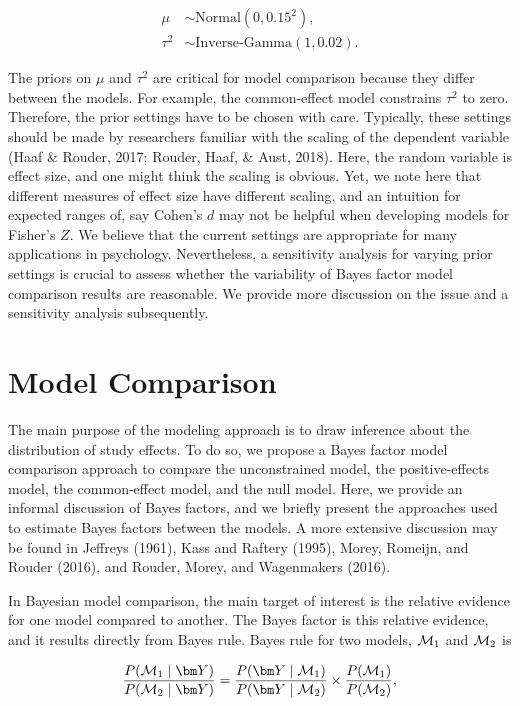 \documentclass[english,,man]{apa6}
\begin{document}
\begin{align*}
\mu &\sim \mbox{Normal}(0, 0.15^2),\\
\tau^2 &\sim \mbox{Inverse-Gamma}(1, 0.02).
\end{align*}

The priors on \(\mu\) and \(\tau^2\) are critical for model comparison because they differ between the models. For example, the common-effect model constrains \(\tau^2\) to zero. Therefore, the prior settings have to be chosen with care. Typically, these settings should be made by researchers familiar with the scaling of the dependent variable (Haaf \& Rouder, 2017; Rouder, Haaf, \& Aust, 2018). Here, the random variable is effect size, and one might think the scaling is obvious. Yet, we note here that different measures of effect size have different scaling, and an intuition for expected ranges of, say Cohen's \(d\) may not be helpful when developing models for Fisher's \(Z\). We believe that the current settings are appropriate for many applications in psychology. Nevertheless, a sensitivity analysis for varying prior settings is crucial to assess whether the variability of Bayes factor model comparison results are reasonable. We provide more discussion on the issue and a sensitivity analysis subsequently.

\hypertarget{model-comparison}{%
\section{Model Comparison}\label{model-comparison}}

The main purpose of the modeling approach is to draw inference about the distribution of study effects.
To do so, we propose a Bayes factor model comparison approach to compare the unconstrained model, the positive-effects model, the common-effect model, and the null model. Here, we provide an informal discussion of Bayes factors, and we briefly present the approaches used to estimate Bayes factors between the models. A more extensive discussion may be found in Jeffreys (1961), Kass and Raftery (1995), Morey, Romeijn, and Rouder (2016), and Rouder, Morey, and Wagenmakers (2016).

In Bayesian model comparison, the main target of interest is the relative evidence for one model compared to another. The Bayes factor is this relative evidence, and it results directly from Bayes rule. Bayes rule for two models, \({\cal M}_1\) and \({\cal M}_2\) is

\begin{equation}\label{bayesrule}
\frac{P({\cal M}_1 \mid \bm Y)}{P({\cal M}_2 \mid \bm Y)} = \frac{P(\bm Y\mid {\cal M}_1)}{P(\bm Y\mid {\cal M}_2)} \times \frac{P({\cal M}_1)}{P({\cal M}_2)},
\end{equation}
\end{document}
